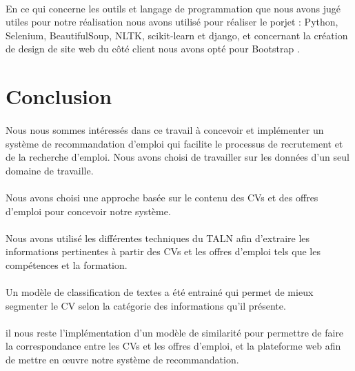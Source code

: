 \documentclass{article}
\begin{document}
\paragraph{}En ce qui concerne les outils et langage de programmation que nous avons jugé utiles pour notre réalisation nous avons utilisé pour réaliser le porjet  : Python, Selenium, BeautifulSoup, NLTK, scikit-learn et django, et concernant la création de design de site web du côté client nous avons opté pour Bootstrap . 


\newpage
\section{Conclusion}

\paragraph{}
Nous nous sommes intéressés dans ce travail à concevoir et implémenter un système de recommandation d'emploi qui facilite le processus de recrutement et de la recherche d'emploi. Nous avons choisi de travailler sur les données d'un seul domaine de travaille.

\paragraph{}Nous avons choisi une approche basée sur le contenu des CVs et des offres d'emploi pour concevoir notre système.

\paragraph{} Nous avons utilisé les différentes techniques du TALN afin d'extraire les informations pertinentes à partir des CVs et les offres d'emploi tels que les compétences et la formation.

\paragraph{} Un modèle de classification de textes a été entrainé  qui permet de mieux segmenter le CV selon la catégorie des informations qu'il présente.


\paragraph{} il nous reste l'implémentation d'un modèle de similarité pour permettre de faire la correspondance entre les CVs et les offres d'emploi, et la plateforme web afin de mettre en œuvre notre système de recommandation.
\end{document}
